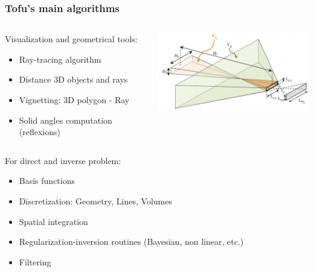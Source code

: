 \documentclass[10pt]{beamer}
\begin{document}
\begin{frame}
\frametitle{Tofu's main algorithms}


\begin{columns}
\begin{column}{0.6\textwidth}
Visualization and geometrical tools:
	\begin{itemize}
	\item Ray-tracing algorithm
	\item Distance 3D objects and rays
	\item Vignetting: 3D polygon - Ray%
	\item Solid angles computation (reflexions)
	\end{itemize}
\end{column}
\begin{column}{0.4\textwidth}

\begin{center}
    	\hspace{-0.5cm}\includegraphics[width=\linewidth]{figures/cones.png}
\end{center}
\end{column}
\end{columns}

\vspace{0.2cm}
For direct and inverse problem:
\begin{itemize}
	\item Basis functions
	\item Discretization: Geometry, Lines, Volumes
	\item Spatial integration
	\item Regularization-inversion routines (Bayesian, non linear, etc.)
	\item Filtering
	\end{itemize}
\end{frame}
\end{document}

